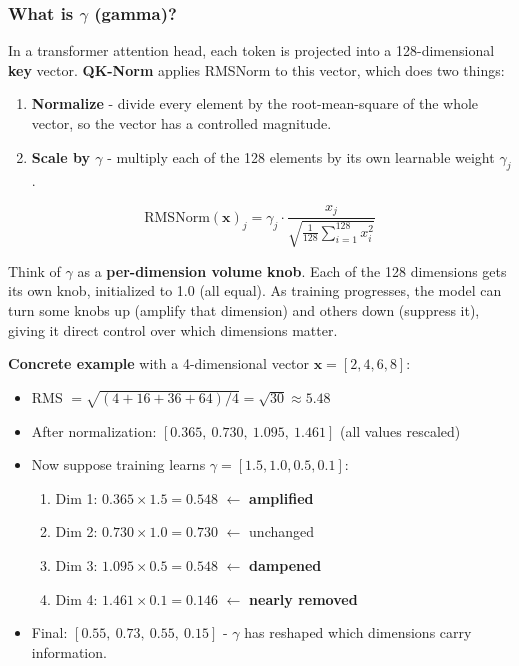 \documentclass[11pt]{article}
\begin{document}
\subsubsection{What is $\gamma$ (gamma)?}

In a transformer attention head, each token is projected into a 128-dimensional \textbf{key} vector. \textbf{QK-Norm} applies RMSNorm to this vector, which does two things:

\begin{enumerate}
\item \textbf{Normalize} - divide every element by the root-mean-square of the whole vector, so the vector has a controlled magnitude.
\item \textbf{Scale by $\gamma$} - multiply each of the 128 elements by its own learnable weight $\gamma_j$.
\end{enumerate}

$$\text{RMSNorm}(\mathbf{x})_j = \gamma_j \cdot \frac{x_j}{\sqrt{\frac{1}{128}\sum_{i=1}^{128} x_i^2}}$$

Think of $\gamma$ as a \textbf{per-dimension volume knob}. Each of the 128 dimensions gets its own knob, initialized to 1.0 (all equal). As training progresses, the model can turn some knobs up (amplify that dimension) and others down (suppress it), giving it direct control over which dimensions matter.

\textbf{Concrete example} with a 4-dimensional vector $\mathbf{x} = [2, 4, 6, 8]$:
\begin{itemize}
\item RMS $= \sqrt{(4 + 16 + 36 + 64)/4} = \sqrt{30} \approx 5.48$
\item After normalization: $[0.365,\ 0.730,\ 1.095,\ 1.461]$ (all values rescaled)
\item Now suppose training learns $\gamma = [1.5, 1.0, 0.5, 0.1]$:
\begin{enumerate}
\item Dim 1: $0.365 \times 1.5 = 0.548$ $\leftarrow$ \textbf{amplified}
\item Dim 2: $0.730 \times 1.0 = 0.730$ $\leftarrow$ unchanged
\item Dim 3: $1.095 \times 0.5 = 0.548$ $\leftarrow$ \textbf{dampened}
\item Dim 4: $1.461 \times 0.1 = 0.146$ $\leftarrow$ \textbf{nearly removed}
\end{enumerate}
\item Final: $[0.55,\ 0.73,\ 0.55,\ 0.15]$ - $\gamma$ has reshaped which dimensions carry information.
\end{itemize}
\end{document}
